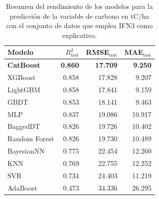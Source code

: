 \begin{table}
    \centering
    \caption{Resumen del rendimiento de los modelos para la predicción de la variable de carbono en tC/ha con el conjunto de datos que emplea IFN3 como explicativo.}
    \label{tab:resultados_modelos_base_ifn3}
    \begin{tabular}{lrrr}
        \toprule
        Modelo            & $R^2_{\text{test}}$ & RMSE$_{\text{test}}$ & MAE$_{\text{test}}$ \\
        \midrule
        \textbf{CatBoost} & \textbf{0.860}      & \textbf{17.709}      & \textbf{9.250}      \\
        XGBoost           & 0.858               & 17.828               & 9.207               \\
        LightGBM          & 0.858               & 17.841               & 9.159               \\
        GBDT              & 0.853               & 18.141               & 9.463               \\
        MLP               & 0.837               & 19.086               & 10.917              \\
        BaggedDT          & 0.826               & 19.726               & 10.402              \\
        Random Forest     & 0.826               & 19.730               & 10.489              \\
        BayesianNN        & 0.775               & 22.454               & 12.260              \\
        KNN               & 0.769               & 22.755               & 12.252              \\
        SVR               & 0.734               & 24.403               & 11.219              \\
        AdaBoost          & 0.473               & 34.336               & 26.295              \\
        \bottomrule
    \end{tabular}
\end{table}

